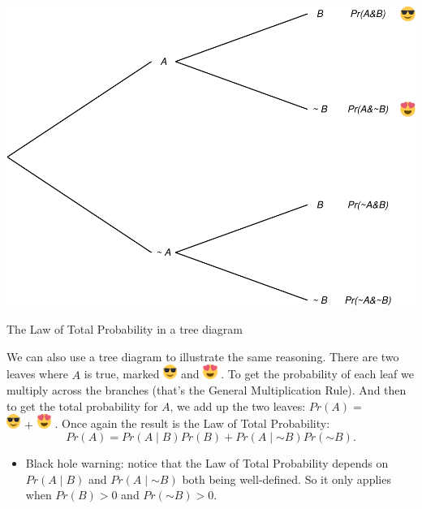 \documentclass[justified]{tufte-book}
\newcommand{\given}{\mid}
\renewcommand{\neg}{\mathbin{\sim}}
\newcommand{\gt}{>}
\newcommand{\p}{Pr}
\newenvironment{warning}{\begin{itemize}\item[\faBan]}{\end{itemize}}
\theoremstyle{definition}
\theoremstyle{definition}
\theoremstyle{definition}
\theoremstyle{remark}
\begin{document}
\begin{marginfigure}
\includegraphics{_main_files/figure-latex/unnamed-chunk-74-1} \caption[The Law of Total Probability in a tree diagram]{The Law of Total Probability in a tree diagram}\label{fig:unnamed-chunk-74}
\end{marginfigure}

We can also use a tree diagram to illustrate the same reasoning. There are two leaves where \(A\) is true, marked
\includegraphics[width=0.18in]{img/emoji_shades_small} and
\includegraphics[width=0.18in]{img/emoji_hearts_small} . To get the probability of each leaf we multiply across the branches (that's the General Multiplication Rule). And then to get the total probability for \(A\), we add up the two leaves: \(\p(A) =\)\\
\includegraphics[width=0.18in]{img/emoji_shades_small} \(+\)
\includegraphics[width=0.18in]{img/emoji_hearts_small} . Once again the result is the Law of Total Probability:
\[
  \p(A) = \p(A \given B) \p(B) + \p(A \given \neg B) \p(\neg B).
\]

\begin{warning}
Black hole warning: notice that the Law of Total Probability depends on
\(\p(A \given B)\) and \(\p(A \given \neg B)\) both being well-defined.
So it only applies when \(\p(B) \gt 0\) and \(\p(\neg B) \gt 0\).
\end{warning}
\end{document}
